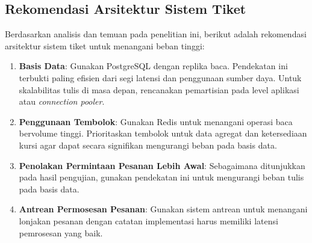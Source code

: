 \subsection{Rekomendasi Arsitektur Sistem Tiket}
\label{rekomendasi-arsitektur}

Berdasarkan analisis dan temuan pada penelitian ini, berikut adalah rekomendasi arsitektur sistem tiket untuk menangani beban tinggi:

\begin{enumerate}
    \item \textbf{Basis Data}: Gunakan PostgreSQL dengan replika baca. Pendekatan ini terbukti paling efisien dari segi latensi dan penggunaan sumber daya. Untuk skalabilitas tulis di masa depan, rencanakan pemartisian pada level aplikasi atau \textit{connection pooler}.

    \item \textbf{Penggunaan Tembolok}: Gunakan Redis untuk menangani operasi baca bervolume tinggi. Prioritaskan tembolok untuk data agregat dan ketersediaan kursi agar dapat secara signifikan mengurangi beban pada basis data.

    \item \textbf{Penolakan Permintaan Pesanan Lebih Awal}: Sebagaimana ditunjukkan pada hasil pengujian, gunakan pendekatan ini untuk mengurangi beban tulis pada basis data.

    \item \textbf{Antrean Permosesan Pesanan}: Gunakan sistem antrean untuk menangani lonjakan pesanan dengan catatan implementasi harus memiliki latensi pemrosesan yang baik.
\end{enumerate}
